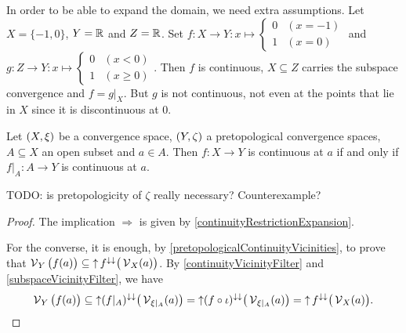 \begin{example}
In order to be able to expand the domain, we need extra assumptions. Let $X = \{-1,0\}$, $Y = \mathbb{R}$ and $Z = \mathbb{R}$. Set $f: X\to Y: x\mapsto \begin{cases}
0 & (x=-1) \\ 1 & (x = 0)
\end{cases}$ and $g: Z\to Y: x\mapsto \begin{cases}
0 & (x < 0) \\
1 & (x \geq 0)
\end{cases}$. Then $f$ is continuous, $X \subseteq Z$ carries the subspace convergence and $f = g|_X$. But $g$ is not continuous, not even at the points that lie in $X$ since it is discontinuous at $0$.
\end{example}

\begin{proposition} \label{continuityExpandedDomain}
Let $\sSet{X,\xi}$ be a convergence space, $\sSet{Y,\zeta}$ a pretopological convergence spaces, $A\subseteq X$ an open subset and $a\in A$. Then $f: X\to Y$ is continuous at $a$ \textup{if and only if} $f|_A: A\to Y$ is continuous at $a$.
\end{proposition}
TODO: is pretopologicity of $\zeta$ really necessary? Counterexample?
\begin{proof}
The implication $\Rightarrow$ is given by \ref{continuityRestrictionExpansion}.

For the converse, it is enough, by \ref{pretopologicalContinuityVicinities}, to prove that $\operatorname{\mathcal{V}}_Y\big(f(a)\big) \subseteq \operatorname{\uparrow} f^{\downarrow\downarrow}\big(\operatorname{\mathcal{V}}_{X}(a)\big)$.
By \ref{continuityVicinityFilter} and \ref{subspaceVicinityFilter}, we have
\[ \operatorname{\mathcal{V}}_Y\big(f(a)\big) \subseteq \operatorname{\uparrow} (f|_A)^{\downarrow\downarrow}\big(\operatorname{\mathcal{V}}_{\xi|_A}(a)\big) = \operatorname{\uparrow} (f\circ \iota)^{\downarrow\downarrow}\big(\operatorname{\mathcal{V}}_{\xi|_A}(a)\big) = \operatorname{\uparrow} f^{\downarrow\downarrow}\big(\operatorname{\mathcal{V}}_{X}(a)\big). \]
\end{proof}

